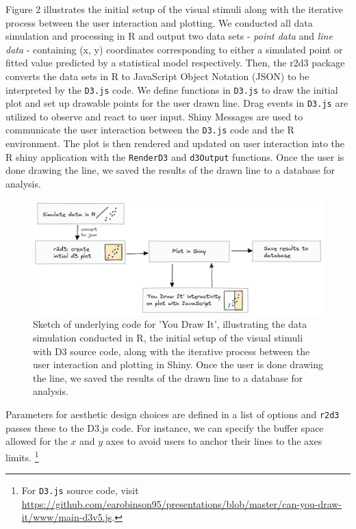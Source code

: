 \documentclass[10pt]{article}
\begin{document}
Figure 2 illustrates the initial setup of the visual stimuli along with
the iterative process between the user interaction and plotting. We
conducted all data simulation and processing in R and output two data
sets - \emph{point data} and \emph{line data} - containing (x, y)
coordinates corresponding to either a simulated point or fitted value
predicted by a statistical model respectively. Then, the r2d3 package
converts the data sets in R to JavaScript Object Notation (JSON) to be
interpreted by the \texttt{D3.js} code. We define functions in
\texttt{D3.js} to draw the initial plot and set up drawable points for
the user drawn line. Drag events in \texttt{D3.js} are utilized to
observe and react to user input. Shiny Messages are used to communicate
the user interaction between the \texttt{D3.js} code and the R
environment. The plot is then rendered and updated on user interaction
into the R shiny application with the \texttt{RenderD3} and
\texttt{d3Output} functions. Once the user is done drawing the line, we
saved the results of the drawn line to a database for analysis.

\begin{figure}[ht]
\begin{center}
\centerline{\includegraphics[width=\columnwidth]{images/code-sketch-2}}
\caption{Sketch of underlying code for 'You Draw It', illustrating the data simulation conducted in R, the initial setup of the visual stimuli with D3 source code, along with the iterative process between the user interaction and plotting in Shiny. Once the user is done drawing the line, we saved the results of the drawn line to a database for analysis.}
\label{you-draw-it-code-sketch}
\end{center}
\end{figure}

Parameters for aesthetic design choices are defined in a list of options
and \texttt{r2d3} passes these to the D3.js code. For instance, we can
specify the buffer space allowed for the \(x\) and \(y\) axes to avoid
users to anchor their lines to the axes limits. \footnote{For
  \texttt{D3.js} source code, visit
  \url{https://github.com/earobinson95/presentations/blob/master/can-you-draw-it/www/main-d3v5.js}.}
\end{document}
